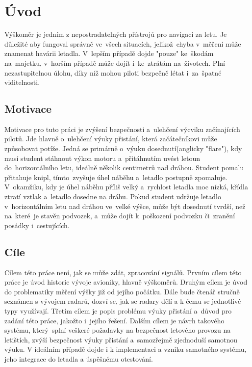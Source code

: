 
\newtheorem{definice}{Definice}

\chapter{Úvod}\label{uvod}
	Výškoměr je jedním z nepostradatelných přístrojů pro navigaci za letu. Je důležité aby fungoval správně ve~všech situacích, jelikož~chyba v~měření může znamenat havárii letadla. V~lepším případě dojde "pouze" ke~škodám na~majetku, v~horším případě může dojít i~ke~ztrátám na~životech. Plní nezastupitelnou úlohu, díky níž mohou piloti bezpečně létat i~za~špatné viditelnosti.
	
	\section{Motivace}\label{uvod::motivace}
		Motivace pro tuto práci je zvýšení bezpečnosti a~ulehčení výcviku začínajících pilotů. Jde hlavně o~ulehčení výuky přistání, která začátečníkovi může způsobovat potíže. Jedná se primárně o~výuku dosednutí(anglicky "flare"), kdy musí student stáhnout výkon motoru a~přitáhnutím uvést letoun do~horizontálního letu, ideálně několik centimetrů nad dráhou. Student pomalu přitahuje knipl, tímto~zvyšuje úhel náběhu a~letadlo postupně zpomaluje. V~okamžiku, kdy je úhel náběhu příliš velký a~rychlost letadla moc nízká, křídla ztratí vztlak a~letadlo dosedne na dráhu. Pokud student udržuje letadlo v~horizontálním letu nad dráhou ve~velké výšce, může být dosednutí tvrdší, než na~které~je stavěn podvozek, a~může dojít k~poškození podvozku či~zranění posádky i~cestujících.
	
	\section{Cíle}\label{uvod::cile}
	Cílem této práce není, jak se může zdát, zpracování signálů. Prvním cílem této práce je úvod historie vývoje avioniky, hlavně výškoměrů. Druhým cílem je úvod do problematiky měření výšky již od jejího počátku. Dále bude čtenář stručně seznámen s vývojem radarů, dozví se, jak se radary dělí a k čemu se jednotlivé typy využívají.
	Třetím cílem je popis problému výuky přistání a~důvod pro zadání této práce, jakožto i~jejího řešení. Dalším cílem je návrh takového systému, který~splní veškeré požadavky na bezpečnost letového provozu na letištích, zvýší bezpečnost výuky přistání a~samozřejmě zjednoduší samotnou výuku. V ideálním případě dojde i k implementaci a vzniku samotného systému, jeho integrace do letadla a úspěšnému otestování.


